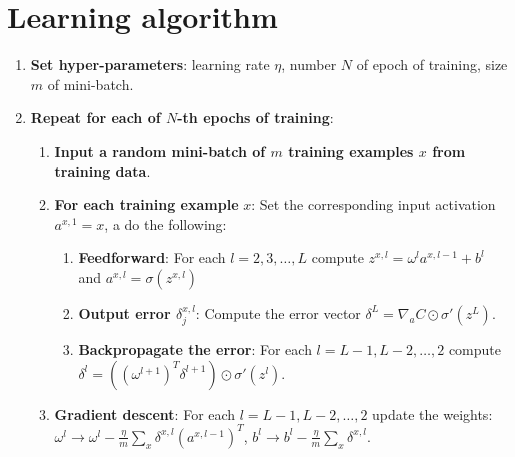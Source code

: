 \documentclass[a4paper,12pt]{article}
\theoremstyle{plain} %
\theoremstyle{definition} %
\theoremstyle{remark} %
\begin{document}
\section{Learning algorithm}
\begin{enumerate}
	\item \textbf{Set hyper-parameters}: learning rate $\eta$, number $N$ of epoch of training, size $m$ of mini-batch.
	\item \textbf{Repeat for each of $N$-th epochs of training}:
	\begin{enumerate}
		\item \textbf{Input a random mini-batch of $m$ training examples $x$ from training data}.
		\item \textbf{For each training example} $x$: Set the corresponding input activation $a^{x,1} = x$, a do the following:
		\begin{enumerate}
			\item \textbf{Feedforward}: For each $l = 2, 3, \ldots, L$ compute $z^{x,l} = \omega^la^{x,l-1}+b^l$ and $a^{x,l} = \sigma(z^{x,l})$
			\item \textbf{Output error $\delta _j^{x, l}$}: Compute the error vector ${\delta ^L} = {\nabla _a}C \odot \sigma '({z^L})$.
			\item \textbf{Backpropagate the error}: For each $l = L-1, L-2, \ldots, 2$ compute ${\delta ^l} = \left( {{{\left( {{\omega ^{l + 1}}} \right)}^T}{\delta ^{l + 1}}} \right) \odot \sigma '({z^l})$.
		\end{enumerate} 
		\item \textbf{Gradient descent}: For each $l = L-1, L-2, \ldots, 2$ update the weights: ${\omega ^l} \to {\omega ^l} - \frac{\eta }{m}\sum\limits_x {{\delta ^{x,l}}{{\left( {{a^{x,l - 1}}} \right)}^T}}$, ${b^l} \to {b^l} - \frac{\eta }{m}\sum\limits_x {{\delta ^{x,l}}} $.
	\end{enumerate}
	\end{enumerate}
	
\end{document}
